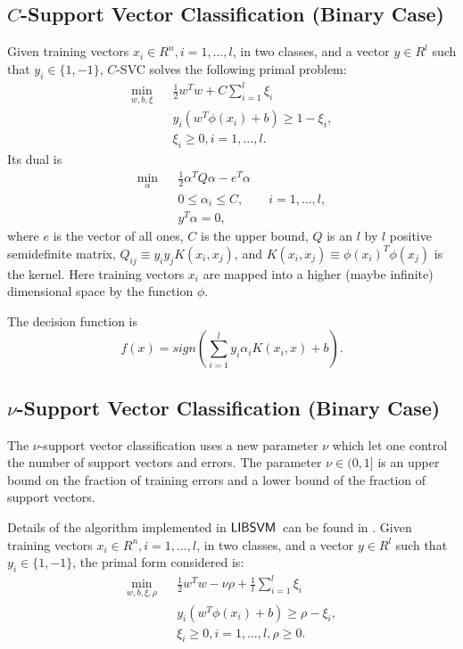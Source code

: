 \documentclass[11pt]{article}
\newcommand{\libsvm}{$\mbox{{\sf LIBSVM}}$}
\theoremstyle{break}
\begin{document}
\subsection{$C$-Support Vector Classification (Binary
Case)}
Given training vectors $x_i \in R^n, i = 1, 
\ldots,l$, 
in two classes, 
and a vector
$y\in R^l$ such that
$
y_i \in \{1, -1 \}$,
$C$-SVC 
solves the following
primal problem:
\begin{eqnarray}
 \min_{w,b,\xi} && \frac{1}{2} w^T w
+ C \sum_{i=1}^l \xi_i \label{primal} \\
&& y_i (w^T \phi(x_i) + b) \geq 1 - \xi_i,
\nonumber \\
&& \xi_i \geq 0, i = 1, \ldots, l. \nonumber 
\end{eqnarray}
Its dual is
\begin{eqnarray}
\min_{\alpha} && \frac{1}{2}\alpha^TQ\alpha - e^T\alpha \nonumber \\
&& 0 \leq \alpha_i \leq C, \qquad i = 1, \ldots, l,   \label{svmqp}\\
&& y^T \alpha = 0, \nonumber
\end{eqnarray}
where $e$ is the vector of all ones,
$C$ is the upper bound,
$Q$ is an 
$l$ by $l$ positive semidefinite matrix, 
$Q_{ij} \equiv y_i y_jK(x_i,x_j)$,
and $K(x_i,x_j) \equiv \phi(x_i)^T
\phi(x_j)$ is the kernel.
Here training vectors $x_i$ are mapped into a
higher (maybe infinite) dimensional space 
by the function $\phi$.


The 
decision function is
\begin{equation*}
f(x) = 
sign(\sum_{i=1}^l 
y_i \alpha_i K(x_i, x) + b).  
\end{equation*}

\subsection{$\nu$-Support Vector Classification
(Binary Case)}
The $\nu$-support vector 
classification
uses a new parameter $\nu$
which let one control the number
of support vectors and errors. 
The parameter $\nu \in (0,1]$ 
is an upper bound on the fraction
of training errors and
a lower bound of the fraction of
support vectors.

Details of the algorithm implemented
in \libsvm\ can be found in .
Given training vectors $x_i \in R^n, i = 1, 
\ldots,l$, 
in two classes, 
and a vector
$y\in R^l$ such that
$
y_i \in \{1, -1 \}$,
the primal form considered is:
\begin{eqnarray*}
\min_{w,b,\xi,\rho} && \frac{1}{2} w^T w 
 - \nu \rho
+ \frac{1}{l} \sum_{i=1}^l \xi_i  \\
&& y_i (w^T \phi(x_i) + b) \geq \rho - \xi_i, 
\nonumber \\
&& \xi_i \geq 0, i = 1, \ldots, l, \rho \geq 0. 
\nonumber 
\end{eqnarray*}
\end{document}
